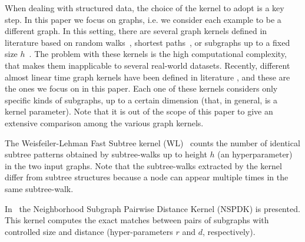 \documentclass{esannV2}
\newcommand{\1}{{\bf 1}}
\begin{document}
When dealing with structured data, the choice of the kernel to adopt is a key step.
%
In this paper we focus on graphs, i.e. we consider each example to be a different graph.
In this setting, there are several graph kernels defined in literature based on random walks~\cite{Kashima03marginalizedkernels,Mahe2004},
shortest paths~\cite{Kriegel05shortestpath}, or
 subgraphs up to a fixed size $h$~\cite{Shervashidze2009}.
 The problem with these kernels is the high computational complexity, that makes them inapplicable to several real-world datasets.
Recently, different almost linear time graph kernels have been defined in literature \cite{Heinonen2009,Costa2010,Shervashidze2011,DaSanMartino2016}, and these are the ones we focus on in this paper.
Each one of these kernels considers only specific kinds of subgraphs, up to a certain dimension (that, in general, is a kernel parameter).
Note that it is out of the scope of this paper to give an extensive comparison among the various graph kernels. 

The Weisfeiler-Lehman Fast Subtree kernel (WL)~\cite{Shervashidze2011}  counts the number of identical subtree patterns obtained by subtree-walks up to height $h$ (an hyperparameter) in the two input graphs. %
Note that the subtree-walks extracted by the kernel differ from  subtree structures because a node can appear multiple times in the same subtree-walk.

In~\cite{Costa2010} the Neighborhood Subgraph Pairwise Distance Kernel (NSPDK) is presented. This kernel computes the exact matches between pairs of subgraphs with controlled size and distance (hyper-parameters $r$ and $d$, respectively). 
\end{document}
